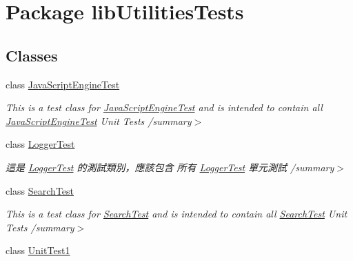 \hypertarget{namespacelib_utilities_tests}{\section{Package lib\+Utilities\+Tests}
\label{namespacelib_utilities_tests}
}
\subsection*{Classes}
\begin{DoxyCompactItemize}
\item 
class \hyperlink{classlib_utilities_tests_1_1_java_script_engine_test}{Java\+Script\+Engine\+Test}
\begin{DoxyCompactList}\small\item\em This is a test class for \hyperlink{classlib_utilities_tests_1_1_java_script_engine_test}{Java\+Script\+Engine\+Test} and is intended to contain all \hyperlink{classlib_utilities_tests_1_1_java_script_engine_test}{Java\+Script\+Engine\+Test} Unit Tests /summary$>$ \end{DoxyCompactList}\item 
class \hyperlink{classlib_utilities_tests_1_1_logger_test}{Logger\+Test}
\begin{DoxyCompactList}\small\item\em 這是 \hyperlink{classlib_utilities_tests_1_1_logger_test}{Logger\+Test} 的測試類別，應該包含 所有 \hyperlink{classlib_utilities_tests_1_1_logger_test}{Logger\+Test} 單元測試 /summary$>$ \end{DoxyCompactList}\item 
class \hyperlink{classlib_utilities_tests_1_1_search_test}{Search\+Test}
\begin{DoxyCompactList}\small\item\em This is a test class for \hyperlink{classlib_utilities_tests_1_1_search_test}{Search\+Test} and is intended to contain all \hyperlink{classlib_utilities_tests_1_1_search_test}{Search\+Test} Unit Tests /summary$>$ \end{DoxyCompactList}\item 
class \hyperlink{classlib_utilities_tests_1_1_unit_test1}{Unit\+Test1}
\end{DoxyCompactItemize}
